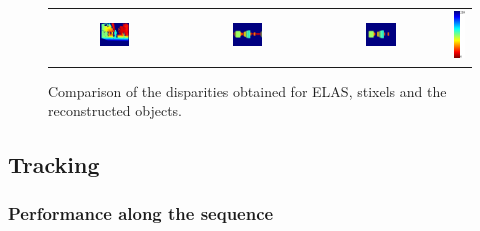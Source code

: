 \begin{figure}[h!]
\begin{tabular}{cccc}
\includegraphics[width=0.25\textwidth]{elas}\label{fig:cp04_reconstruction_elas} & 
\includegraphics[width=0.25\textwidth]{stixels}\label{fig:cp04_reconstruction_stixels} & 
\includegraphics[width=0.25\textwidth]{objects}\label{fig:cp04_reconstruction_objects} &
\includegraphics[height=0.1875\textwidth]{colorscale_jet}\label{fig:cp04_reconstruction_colorscale} %
\end{tabular}
\caption{Comparison of the disparities obtained for \ac{ELAS}, stixels and the reconstructed objects.}\label{fig:cp04_reconstruction}
\end{figure}

\subsection{Tracking}\label{ch:chapter04_02_03}

\subsubsection{Performance along the sequence}\label{ch:chapter04_02_03_01}

